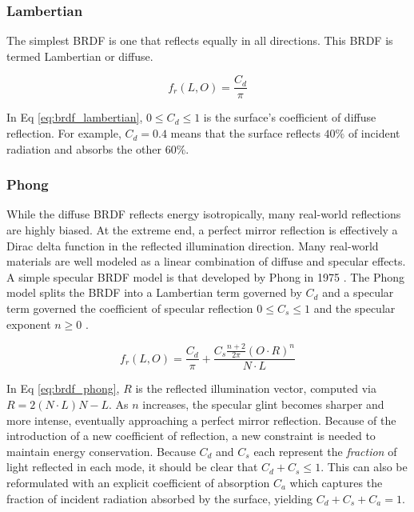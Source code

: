 \subsubsection{Lambertian}

The simplest BRDF is one that reflects equally in all directions. This BRDF is termed Lambertian or diffuse.

\begin{equation} \label{eq:brdf_lambertian}
  f_r(L, O) = \frac{C_d}{\pi}
\end{equation}

In Eq \ref{eq:brdf_lambertian}, $0 \leq C_d \leq 1$ is the surface's coefficient of diffuse reflection. For example, $C_d = 0.4$ means that the surface reflects $40\%$ of incident radiation and absorbs the other $60\%$. 

\subsubsection{Phong}

While the diffuse BRDF reflects energy isotropically, many real-world reflections are highly biased. At the extreme end, a perfect mirror reflection is effectively a Dirac delta function in the reflected illumination direction. Many real-world materials are well modeled as a linear combination of diffuse and specular effects. A simple specular BRDF model is that developed by Phong in 1975 \cite{phong1975}. The Phong model splits the BRDF into a Lambertian term governed by $C_d$ and a specular term governed the coefficient of specular reflection $ 0 \leq C_s \leq 1$ and the specular exponent $n \geq 0$ \cite{duvenhage2013}. 

\begin{equation} \label{eq:brdf_phong}
  f_r(L, O) = \frac{C_d}{\pi} + \frac{C_s \frac{n+2}{2\pi} (O \cdot R)^n}{N \cdot L}
\end{equation}

In Eq \ref{eq:brdf_phong}, $R$ is the reflected illumination vector, computed via $R = 2 (N \cdot L) N - L$. As $n$ increases, the specular glint becomes sharper and more intense, eventually approaching a perfect mirror reflection. Because of the introduction of a new coefficient of reflection, a new constraint is needed to maintain energy conservation. Because $C_d$ and $C_s$ each represent the \textit{fraction} of light reflected in each mode, it should be clear that $C_d + C_s \leq 1$. This can also be reformulated with an explicit coefficient of absorption $C_a$ which captures the fraction of incident radiation absorbed by the surface, yielding $C_d + C_s + C_a = 1$. 

